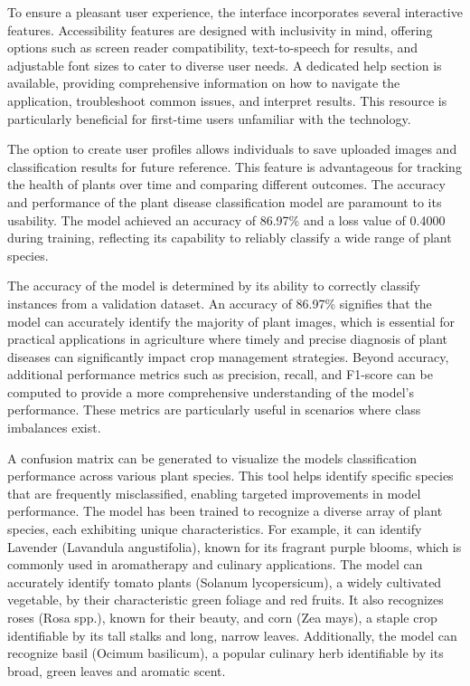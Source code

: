 \documentclass[
]{article}
\begin{document}
To ensure a pleasant user experience, the interface incorporates several
interactive features. Accessibility features are designed with
inclusivity in mind, offering options such as screen reader
compatibility, text-to-speech for results, and adjustable font sizes to
cater to diverse user needs. A dedicated help section is available,
providing comprehensive information on how to navigate the application,
troubleshoot common issues, and interpret results. This resource is
particularly beneficial for first-time users unfamiliar with the
technology.

The option to create user profiles allows individuals to save uploaded
images and classification results for future reference. This feature is
advantageous for tracking the health of plants over time and comparing
different outcomes. The accuracy and performance of the plant disease
classification model are paramount to its usability. The model achieved
an accuracy of 86.97\% and a loss value of 0.4000 during training,
reflecting its capability to reliably classify a wide range of plant
species.

The accuracy of the model is determined by its ability to correctly
classify instances from a validation dataset. An accuracy of 86.97\%
signifies that the model can accurately identify the majority of plant
images, which is essential for practical applications in agriculture
where timely and precise diagnosis of plant diseases can significantly
impact crop management strategies. Beyond accuracy, additional
performance metrics such as precision, recall, and F1-score can be
computed to provide a more comprehensive understanding of the model's
performance. These metrics are particularly useful in scenarios where
class imbalances exist.

A confusion matrix can be generated to visualize the
model\textquotesingle s classification performance across various plant
species. This tool helps identify specific species that are frequently
misclassified, enabling targeted improvements in model performance. The
model has been trained to recognize a diverse array of plant species,
each exhibiting unique characteristics. For example, it can identify
Lavender (Lavandula angustifolia), known for its fragrant purple blooms,
which is commonly used in aromatherapy and culinary applications. The
model can accurately identify tomato plants (Solanum lycopersicum), a
widely cultivated vegetable, by their characteristic green foliage and
red fruits. It also recognizes roses (Rosa spp.), known for their
beauty, and corn (Zea mays), a staple crop identifiable by its tall
stalks and long, narrow leaves. Additionally, the model can recognize
basil (Ocimum basilicum), a popular culinary herb identifiable by its
broad, green leaves and aromatic scent.
\end{document}
